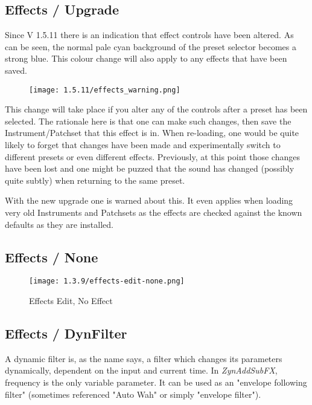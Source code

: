 \subsection{Effects / Upgrade}
\label{subsec:effects_upgrade}
   Since V 1.5.11 there is an indication that effect controls have been altered. As can
   be seen, the normal pale cyan background of the preset selector becomes a strong blue.
   This colour change will also apply to any effects that have been saved.
   \begin{figure}[H]
   \centering
   \texttt{[image: 1.5.11/effects\_warning.png]}
   \label{fig:effects_warning}
\end{figure}

   This change will take place if you alter any of the controls after a preset has been
   selected. The rationale here is that one can make such changes, then save the
   Instrument/Patchset that this effect is in.
   When re-loading, one would be quite likely to forget that changes have been made and
   experimentally switch to different presets or even different effects.
   Previously, at this point those changes have been lost and one might be puzzed that
   the sound has changed (possibly quite subtly) when returning to the same preset.

   With the new upgrade one is warned about this. It even applies when loading very old
   Instruments and Patchsets as the effects are checked against the known defaults as
   they are installed.

\subsection{Effects / None}
\label{subsec:effects_edit_none}

\begin{figure}[H]
   \centering
   \texttt{[image: 1.3.9/effects-edit-none.png]}
   \caption{Effects Edit, No Effect}
   \label{fig:effects_edit_none}
\end{figure}

\subsection{Effects / DynFilter}
\label{subsec:effects_edit_dynfilter}

   A dynamic filter is, as the name says, a filter which changes its
   parameters dynamically, dependent on the input and current time. In
   \textsl{ZynAddSubFX}, frequency is the only variable parameter. It can be
   used as an "envelope following filter" (sometimes referenced "Auto Wah" or
   simply "envelope filter").

